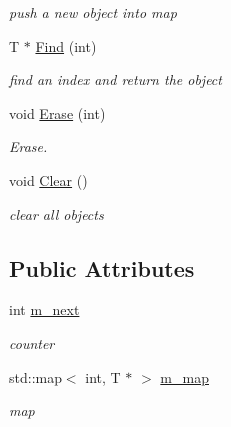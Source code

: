\begin{DoxyCompactItemize}
\begin{DoxyCompactList}\small\item\em push a new object into map \item\end{DoxyCompactList}\item 
\hypertarget{classMapPtr_a8d547c988e5e4d4784f3344164adede7}{
T $\ast$ \hyperlink{classMapPtr_a8d547c988e5e4d4784f3344164adede7}{Find} (int)}
\label{classMapPtr_a8d547c988e5e4d4784f3344164adede7}

\begin{DoxyCompactList}\small\item\em find an index and return the object \item\end{DoxyCompactList}\item 
\hypertarget{classMapPtr_ab4e0ff3976f38802878fc819ba1bd6c0}{
void \hyperlink{classMapPtr_ab4e0ff3976f38802878fc819ba1bd6c0}{Erase} (int)}
\label{classMapPtr_ab4e0ff3976f38802878fc819ba1bd6c0}

\begin{DoxyCompactList}\small\item\em Erase. \item\end{DoxyCompactList}\item 
\hypertarget{classMapPtr_a3ab8a723fc90b518a9fb9b47a17d6716}{
void \hyperlink{classMapPtr_a3ab8a723fc90b518a9fb9b47a17d6716}{Clear} ()}
\label{classMapPtr_a3ab8a723fc90b518a9fb9b47a17d6716}

\begin{DoxyCompactList}\small\item\em clear all objects \item\end{DoxyCompactList}\end{DoxyCompactItemize}
\subsection*{Public Attributes}
\begin{DoxyCompactItemize}
\item 
\hypertarget{classMapPtr_a677d1231f7a8bddff44c72219543193c}{
int \hyperlink{classMapPtr_a677d1231f7a8bddff44c72219543193c}{m\_\-next}}
\label{classMapPtr_a677d1231f7a8bddff44c72219543193c}

\begin{DoxyCompactList}\small\item\em counter \item\end{DoxyCompactList}\item 
\hypertarget{classMapPtr_a1149debec7d2589d3ab5c49bf179e0e5}{
std::map$<$ int, T $\ast$ $>$ \hyperlink{classMapPtr_a1149debec7d2589d3ab5c49bf179e0e5}{m\_\-map}}
\label{classMapPtr_a1149debec7d2589d3ab5c49bf179e0e5}

\begin{DoxyCompactList}\small\item\em map \item\end{DoxyCompactList}\end{DoxyCompactItemize}


